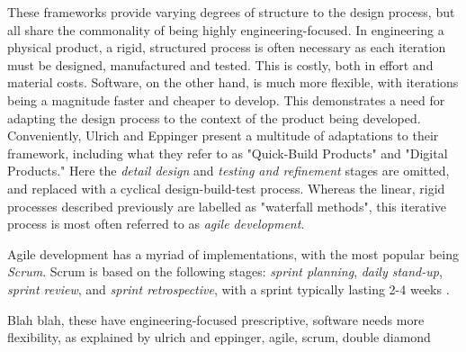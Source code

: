 These frameworks provide varying degrees of structure to the design process, but all share the commonality of being highly engineering-focused. In engineering a physical product, a rigid, structured process is often necessary as each iteration must be designed, manufactured and tested. This is costly, both in effort and material costs. Software, on the other hand, is much more flexible, with iterations being a magnitude faster and cheaper to develop. This demonstrates a need for adapting the design process to the context of the product being developed. Conveniently, Ulrich and Eppinger present a multitude of adaptations to their framework, including what they refer to as "Quick-Build Products" and "Digital Products." Here the \textit{detail design} and \textit{testing and refinement} stages are omitted, and replaced with a cyclical design-build-test process. Whereas the linear, rigid processes described previously are labelled as "waterfall methods", this iterative process is most often referred to as \textit{agile development}.

Agile development has a myriad of implementations, with the most popular being \textit{Scrum}. Scrum is based on the following stages: \textit{sprint planning}, \textit{daily stand-up}, \textit{sprint review}, and \textit{sprint retrospective}, with a sprint typically lasting 2-4 weeks \cite{scrum}.

Blah blah, these have engineering-focused prescriptive, software needs more flexibility, as explained by ulrich and eppinger, agile, scrum, double diamond





